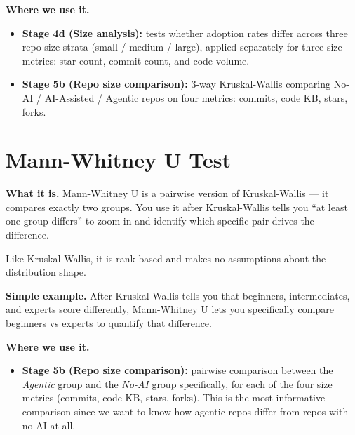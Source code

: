 \documentclass[11pt,a4paper]{article}
\begin{document}
\begin{wherebox}
\textbf{Where we use it.}
\begin{itemize}
  \item \textbf{Stage 4d (Size analysis):} tests whether adoption rates differ across three
        repo size strata (small / medium / large), applied separately for three size metrics:
        star count, commit count, and code volume.
  \item \textbf{Stage 5b (Repo size comparison):} 3-way Kruskal-Wallis comparing
        No-AI / AI-Assisted / Agentic repos on four metrics: commits, code KB, stars, forks.
\end{itemize}
\end{wherebox}

\section{Mann-Whitney U Test}

\begin{conceptbox}
\textbf{What it is.}
Mann-Whitney U is a pairwise version of Kruskal-Wallis --- it compares exactly two groups.
You use it after Kruskal-Wallis tells you ``at least one group differs'' to zoom in and
identify which specific pair drives the difference.

\medskip
Like Kruskal-Wallis, it is rank-based and makes no assumptions about the distribution shape.

\medskip
\textbf{Simple example.}
After Kruskal-Wallis tells you that beginners, intermediates, and experts score differently,
Mann-Whitney U lets you specifically compare beginners vs experts to quantify that difference.
\end{conceptbox}

\begin{wherebox}
\textbf{Where we use it.}
\begin{itemize}
  \item \textbf{Stage 5b (Repo size comparison):} pairwise comparison between the
        \emph{Agentic} group and the \emph{No-AI} group specifically, for each of the four
        size metrics (commits, code KB, stars, forks). This is the most informative comparison
        since we want to know how agentic repos differ from repos with no AI at all.
\end{itemize}
\end{wherebox}
\end{document}
